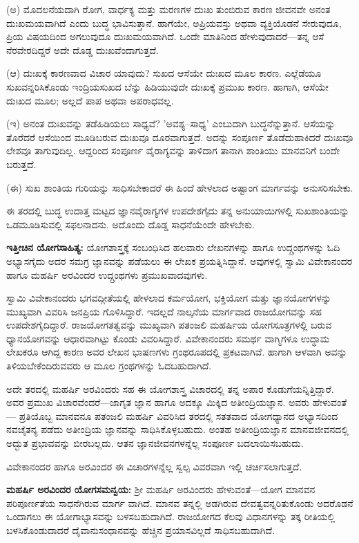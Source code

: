 (ಅ) ಮೊದಲನೆಯದಾಗಿ ರೋಗ, ವಾರ್ಧಕ್ಯ ಮತ್ತು ಮರಣಗಳ ದುಃಖ ತುಂಬಿರುವ ಕಾರಣ ಜೀವನವೇ ಅನಂತ ದುಃಖಮಯವಾಗಿದೆ ಎಂದು ಬುದ್ಧ ಭಾವಿಸುತ್ತಾನೆ. ಹಾಗೆಯೇ, ಅಪ್ರಿಯವಸ್ತು ಅಥವಾ ವ್ಯಕ್ತಿಯೊಡನೆ ಸೇರುವುದೂ, ಪ್ರಿಯ ವಿಷಯದಿಂದ ಅಗಲುವುದೂ ದುಃಖಮಯವಾಗಿದೆ. ಒಂದೇ ಮಾತಿನಿಂದ ಹೇಳುವುದಾದರೆ—ತನ್ನ ಆಸೆ ನೆರವೇರದಿದ್ದರೆ ಅದೇ ದೊಡ್ಡ ದುಃಖವೆಂದಾಗುತ್ತದೆ.

(ಆ) ದುಃಖಕ್ಕೆ ಕಾರಣವಾದ ವಿಚಾರ ಯಾವುದು? ಸುಖದ ಆಸೆಯೇ ದುಃಖದ ಮೂಲ ಕಾರಣ. ಎಲ್ಲೆಡೆಯೂ ಸುಖವನ್ನರಿಸಿಕೊಂಡು ಇಂದ್ರಿಯಸುಖದ ಬೆನ್ನು ಹಿಡಿಯುವುದೇ ದುಃಖಕ್ಕೆ ಪ್ರಮುಖ ಕಾರಣ. ಹಾಗಾಗಿ, ಆಸೆಯೇ ದುಃಖದ ಮೂಲ; ಅಲ್ಲದೆ ಪಾಪ ಅಥವಾ ಅಪರಾಧವಲ್ಲ.

(ಇ) ಅನಂತ ದುಃಖವನ್ನು ತಡೆಹಿಡಿಯಲು ಸಾಧ್ಯವೆ? 'ಅವಶ್ಯ–ಸಾಧ್ಯ' ಎಂಬುದಾಗಿ ಬುದ್ಧನೆನ್ನುತ್ತಾನೆ. ಆಸೆಯನ್ನು ತೊರೆದರೆ ಆಸೆಯಿಂದ ಮೂಡಿಬರುವ ದುಃಖವೂ ದೂರವಾಗುತ್ತದೆ. ಅದನ್ನು ಸಂಪೂರ್ಣ ತೊಡೆದುಹಾಕಿದರೆ ದುಃಖವೂ ಲೇಶವೂ ತಾಗುವುದಿಲ್ಲ. ಆದ್ದರಿಂದ ಸಂಪೂರ್ಣ ವೈರಾಗ್ಯವನ್ನು ತಾಳಿದಾಗ ತಾನಾಗಿ ಶಾಂತಿಯು ಮಾನವನಿಗೆ ಬಂದೇ ಬರುತ್ತದೆ.

(ಈ) ಸುಖ ಶಾಂತಿಯ ಗುರಿಯನ್ನು ಸಾಧಿಸಬೇಕಾದರೆ ಈ ಹಿಂದೆ ಹೇಳಲಾದ ಅಷ್ಟಾಂಗ ಮಾರ್ಗವನ್ನು ಅನುಸರಿಸಬೇಕು.

ಈ ತರದಲ್ಲಿ ಬುದ್ಧ ಉದಾತ್ತ ಮಟ್ಟದ ಜ್ಞಾನವೈರಾಗ್ಯಗಳ ಉಪದೇಶಗೈದು ತನ್ನ ಅನುಯಾಯಿಗಳಲ್ಲಿ ಸುಖಶಾಂತಿಯನ್ನು ಒಡಮೂಡಿಸುವಲ್ಲಿ ಸಫಲನಾದನು. ಅದೊಂದು ದೊಡ್ಡ ಸಾಧನೆಯೆಂದೇ ಹೇಳಬೇಕು.

\textbf{ಇತ್ತೀಚಿನ ಯೋಗಸಾಹಿತ್ಯ:} ಯೋಗಶಾಸ್ತ್ರಕ್ಕೆ ಸಂಬಂಧಿಸಿದ ಹಲವಾರು ಲೇಖನಗಳನ್ನು ಹಾಗೂ ಉದ್ಗ್ರಂಥಗಳನ್ನು ಓದಿ ಅಭ್ಯಾಸಗೈದು ಅದರ ಸಮಗ್ರ ಜ್ಞಾನವನ್ನು ಪಡೆಯಲು ಈ ಲೇಖಕ ಪ್ರಯತ್ನಿಸಿದ್ದಾನೆ. ಅವುಗಳಲ್ಲಿ ಸ್ವಾಮಿ ವಿವೇಕಾನಂದರ ಹಾಗೂ ಮಹರ್ಷಿ ಅರವಿಂದರ ಉದ್ಗ್ರಂಥಗಳು ಪ್ರಮುಖವಾದವುಗಳು.

ಸ್ವಾಮಿ ವಿವೇಕಾನಂದರು ಭಗವದ್ಗೀತೆಯಲ್ಲಿ ಹೇಳಲಾದ ಕರ್ಮಯೋಗ, ಭಕ್ತಿಯೋಗ ಮತ್ತು ಜ್ಞಾನಯೋಗಗಳನ್ನು ಮುಖ್ಯವಾಗಿ ವಿವರಿಸಿ ಜನಪ್ರಿಯ ಗೊಳಿಸಿದ್ದಾರೆ. ಇದಲ್ಲದೆ ನಾಲ್ಕನೆಯ ಮಾರ್ಗವಾದ ರಾಜಯೋಗವನ್ನು ಸಹ ಉಪದೇಶಗೈದಿದ್ದಾರೆ. ರಾಜಯೋಗತತ್ವವನ್ನು ಮುಖ್ಯವಾಗಿ ಪತಂಜಲಿ ಮಹರ್ಷಿಯ ಯೋಗಸೂತ್ರಗಳಲ್ಲಿ ಬರುವ ಧ್ಯಾನಯೋಗವನ್ನು ಆಧಾರವಾಗಿಟ್ಟು ಕೊಂಡು ವಿವರಿಸಿದ್ದಾರೆ. ವಿವೇಕಾನಂದರು ಸಮರ್ಥ ವಾಗ್ಮಿಗಳೂ ಉದ್ಧಾಮ ಲೇಖಕರೂ ಆಗಿದ್ದ ಕಾರಣ ಅವರ ಲೇಖನ ಭಾಷಣಗಳು ಗ್ರಂಥರೂಪದಲ್ಲಿ ಪ್ರಕಟವಾಗಿವೆ. ಹಾಗಾಗಿ ಆಳವಾಗಿ ಅವನ್ನು ತಿಳಿಯಬೇಕೆಂದಿರುವವರು ಆ ಮೂಲ ಗ್ರಂಥಗಳನ್ನು ಓದಬಹುದಾಗಿದೆ.

ಅದೇ ತರದಲ್ಲಿ ಮಹರ್ಷಿ ಅರವಿಂದರು ಸಹ ಈ ಯೋಗಶಾಸ್ತ್ರ ವಿಚಾರದಲ್ಲಿ ತನ್ನ ಅಪಾರ ಕೊಡುಗೆಯನ್ನಿತ್ತಿದ್ದಾರೆ. ಅವರ ಪ್ರಮುಖ ವಿಚಾರವೆಂದರೆ—ಜಾಗೃತ ಜ್ಞಾನ ಹಾಗೂ ಅದಕ್ಕೂ ಮಿಕ್ಕಿದ ಅತೀಂದ್ರಿಯಜ್ಞಾನ. ಅವರು ಹೇಳುವಂತೆ— ಪ್ರತಿಯೊಬ್ಬ ಮಾನವನೂ ಪತಂಜಲಿ ಮಹರ್ಷಿ ವಿವರಿಸಿದ ತರದಲ್ಲಿ ಸತತವಾದ ಯೋಗಧ್ಯಾನದ ಅಭ್ಯಾಸದಿಂದ ನವಚೈತನ್ಯ ಪಡೆದು ಅತೀಂದ್ರಿಯ ಜ್ಞಾನವನ್ನು ಸಾಧಿಸಿಕೊಳ್ಳಬಹುದು. ಅಂತಹ ಅತೀಂದ್ರಿಯಜ್ಞಾನ ಮಾನವಜೀವನದಲ್ಲಿ ಅದ್ಭುತ ಪ್ರಭಾವವನ್ನು ಬೀರಬಲ್ಲದು. ಆತನ ಜ್ಞಾನಜೀವನಗಳನ್ನೆಲ್ಲ ಸಂಪೂರ್ಣ ಬದಲಾಯಿಸಬಹುದು.

ವಿವೇಕಾನಂದರ ಹಾಗೂ ಅರವಿಂದರ ಈ ವಿಚಾರಗಳನ್ನೆಲ್ಲ ಸ್ವಲ್ಪ ವಿವರವಾಗಿ ಇಲ್ಲಿ ಚರ್ಚಿಸಲಾಗುತ್ತದೆ.

\textbf{ಮಹರ್ಷಿ ಅರವಿಂದರ ಯೋಗಸಮನ್ವಯ:} ಶ‍್ರೀ ಮಹರ್ಷಿ ಅರವಿಂದರು ಹೇಳುವಂತೆ—ಯೋಗ ಮಾನವನ ಪರಿಪೂರ್ಣತೆಯ ಸಾಧನೆಗಿರುವ ಮಾರ್ಗ ವಾಗಿದೆ. ಮಾನವ ತನ್ನಲ್ಲಿ ಅಡಗಿರುವ ದೇವತ್ವವನ್ನರಿತುಕೊಂಡು ಅದರೊಡನೆ ಒಂದಾಗಲು ಈ ಯೋಗಾಭ್ಯಾಸವನ್ನು ಬಳಸಬಹುದಾಗಿದೆ. ರಾಜಯೋಗದ ಕೆಲವು ವಿಧಾನಗಳನ್ನು ತಕ್ಕ ರೀತಿಯಲ್ಲಿ ಬಳಸಿಕೊಂಡುದಾದರೆ ದೈವಾನುಸಂಧಾನವನ್ನು ಹೆಚ್ಚಿನ ಪ್ರಯಾಸವಿಲ್ಲದೆ ಸಾಧಿಸಬಹುದಾಗಿದೆ.

